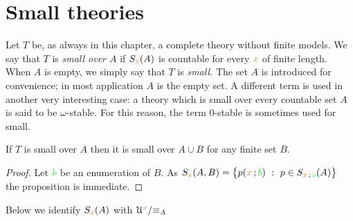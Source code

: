 \section{Small theories}

\def\ceq#1#2#3{\parbox[b]{15ex}{$\displaystyle #1$}\parbox[b]{6ex}{\hfil$#2$}$\displaystyle #3$}

Let $T$ be, as always in this chapter, a complete theory without finite models.
We say that $T$ is \emph{small over $A$\/} if $S_{{\color{brown} x}}(A)$ is countable for every ${\color{brown} x}$ of finite length.
When $A$ is empty, we simply say that $T$ is \emph{small.}
The set $A$ is introduced for convenience; in most application $A$ is the empty set.
A different term is used in another very interesting case: a theory which is small over every countable set $A$ is said to be $\omega$-stable.
For this reason, the term $0$-stable is sometimes used for small.

\begin{proposition}
If $T$ is small over $A$ then it is small over $A\cup B$ for any finite set $B$.
\end{proposition}

\begin{proof}
Let ${\color{green} b}$ be an enumeration of $B$.
As $S_{\mr x}(A,B)=\big\{p({\mr x}\,;{\gr b})\ :\ p\in S_{{\mr x}\,;\,{\gr z}}(A)\big\}$ the proposition is immediate.
\end{proof}

Below we identify $S_{\color{brown} x}(A)$ with $\EuScript U^{\color{brown} x}/\mathord\equiv_A$


